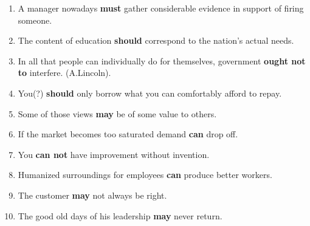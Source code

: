\documentclass[main.tex]{subfiles}
\begin{document}
\begin{enumerate}[nosep,leftmargin=*]
	\item A manager nowadays \textbf{must} gather considerable evidence in support of firing someone.
	\item The content of education \textbf{should} correspond to the nation's actual needs.
	\item In all that people can individually do for themselves, government \textbf{ought not to} interfere. (A.Lincoln).
	\item You(?) \textbf{should} only borrow what you can comfortably afford to repay.
	\item Some of those views \textbf{may} be of some value to others.
	\item If the market becomes too saturated demand \textbf{can} drop off.
	\item You \textbf{can not} have improvement without invention.
	\item Humanized surroundings for employees \textbf{can} produce better workers.
	\item The customer \textbf{may} not always be right.
	\item The good old days of his leadership \textbf{may} never return.
\end{enumerate}
\ 

\end{document}
